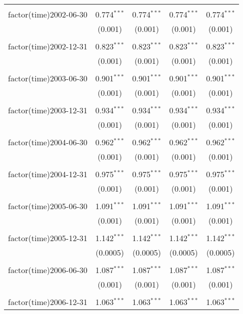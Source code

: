\begin{table}[!htbp]
\begin{tabular}{@{\extracolsep{5pt}}lcccc}
  & & & & \\ 
 factor(time)2002-06-30 & 0.774$^{***}$ & 0.774$^{***}$ & 0.774$^{***}$ & 0.774$^{***}$ \\ 
  & (0.001) & (0.001) & (0.001) & (0.001) \\ 
  & & & & \\ 
 factor(time)2002-12-31 & 0.823$^{***}$ & 0.823$^{***}$ & 0.823$^{***}$ & 0.823$^{***}$ \\ 
  & (0.001) & (0.001) & (0.001) & (0.001) \\ 
  & & & & \\ 
 factor(time)2003-06-30 & 0.901$^{***}$ & 0.901$^{***}$ & 0.901$^{***}$ & 0.901$^{***}$ \\ 
  & (0.001) & (0.001) & (0.001) & (0.001) \\ 
  & & & & \\ 
 factor(time)2003-12-31 & 0.934$^{***}$ & 0.934$^{***}$ & 0.934$^{***}$ & 0.934$^{***}$ \\ 
  & (0.001) & (0.001) & (0.001) & (0.001) \\ 
  & & & & \\ 
 factor(time)2004-06-30 & 0.962$^{***}$ & 0.962$^{***}$ & 0.962$^{***}$ & 0.962$^{***}$ \\ 
  & (0.001) & (0.001) & (0.001) & (0.001) \\ 
  & & & & \\ 
 factor(time)2004-12-31 & 0.975$^{***}$ & 0.975$^{***}$ & 0.975$^{***}$ & 0.975$^{***}$ \\ 
  & (0.001) & (0.001) & (0.001) & (0.001) \\ 
  & & & & \\ 
 factor(time)2005-06-30 & 1.091$^{***}$ & 1.091$^{***}$ & 1.091$^{***}$ & 1.091$^{***}$ \\ 
  & (0.001) & (0.001) & (0.001) & (0.001) \\ 
  & & & & \\ 
 factor(time)2005-12-31 & 1.142$^{***}$ & 1.142$^{***}$ & 1.142$^{***}$ & 1.142$^{***}$ \\ 
  & (0.0005) & (0.0005) & (0.0005) & (0.0005) \\ 
  & & & & \\ 
 factor(time)2006-06-30 & 1.087$^{***}$ & 1.087$^{***}$ & 1.087$^{***}$ & 1.087$^{***}$ \\ 
  & (0.001) & (0.001) & (0.001) & (0.001) \\ 
  & & & & \\ 
 factor(time)2006-12-31 & 1.063$^{***}$ & 1.063$^{***}$ & 1.063$^{***}$ & 1.063$^{***}$ \\ 

\end{tabular}
\end{table}
